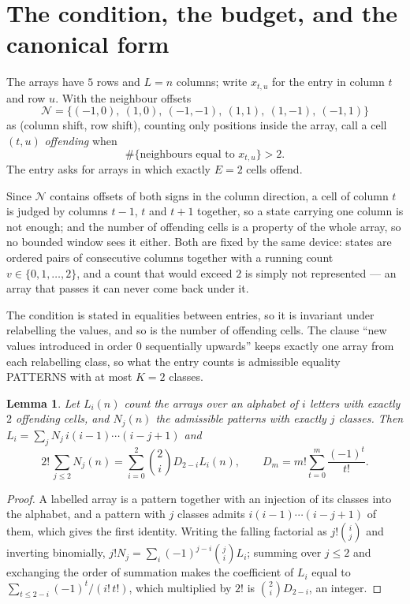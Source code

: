 \documentclass[11pt,a4paper]{article}
\theoremstyle{plain}
\newtheorem{lemma}[theorem]{Lemma}
\theoremstyle{definition}
\begin{document}
\section{The condition, the budget, and the canonical form}

The arrays have $5$ rows and $L=n$ columns; write $x_{t,u}$ for the entry in
column $t$ and row $u$. With the neighbour offsets
\[
\mathcal N=\{(-1,0),\ (1,0),\ (-1,-1),\ (1,1),\ (1,-1),\ (-1,1)\}
\]
as (column shift, row shift), counting only positions inside the array, call a cell
$(t,u)$ \emph{offending} when
\[
\#\{\text{neighbours equal to }x_{t,u}\}>2 .
\]
The entry asks for arrays in which exactly $E=2$ cells offend.

Since $\mathcal N$ contains offsets of both signs in the column direction, a cell of column
$t$ is judged by columns $t-1$, $t$ and $t+1$ together, so a state carrying one column is not
enough; and the number of offending cells is a property of the whole array, so no bounded
window sees it either. Both are fixed by the same device: states are ordered pairs of
consecutive columns together with a running count $v\in\{0,1,\dots,2\}$, and a count that
would exceed $2$ is simply not represented --- an array that passes it can never come back
under it.

The condition is stated in equalities between entries, so it is invariant under relabelling
the values, and so is the number of offending cells. The clause ``new values introduced in
order $0$ sequentially upwards'' keeps exactly one array from each relabelling class, so what
the entry counts is admissible equality PATTERNS with at most $K=2$ classes.

\begin{lemma}\label{lem:inv}
Let $L_i(n)$ count the arrays over an alphabet of $i$ letters with exactly $2$ offending
cells, and $N_j(n)$ the admissible patterns with exactly $j$ classes. Then
$L_i=\sum_j N_j\,i(i-1)\cdots(i-j+1)$ and
\[
2!\,\sum_{j\le2}N_j(n)=\sum_{i=0}^{2}\binom{2}{i}D_{2-i}L_i(n),
\qquad D_m=m!\sum_{t=0}^{m}\frac{(-1)^t}{t!} .
\]
\end{lemma}

\begin{proof}
A labelled array is a pattern together with an injection of its classes into the alphabet,
and a pattern with $j$ classes admits $i(i-1)\cdots(i-j+1)$ of them, which gives the first
identity. Writing the falling factorial as $j!\binom{i}{j}$ and inverting binomially,
$j!N_j=\sum_i(-1)^{j-i}\binom{j}{i}L_i$; summing over $j\le2$ and exchanging the
order of summation makes the coefficient of $L_i$ equal to
$\sum_{t\le2-i}(-1)^t/(i!\,t!)$, which multiplied by $2!$ is
$\binom{2}{i}D_{2-i}$, an integer.
\end{proof}
\end{document}
